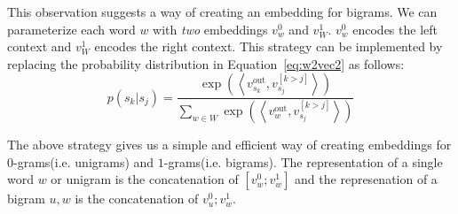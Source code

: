 \documentclass{article}
\renewcommand{\eqref}[1]{Equation~\ref{#1}}
\newcommand{\vo}[1]{v^{\textrm{out}}_{#1}}
\newcommand{\ip}[2]{\left\langle#1, #2\right\rangle}
\begin{document}
This observation suggests a way of creating an embedding for bigrams. We can
parameterize each word $w$ with \textit{two} embeddings $v_w^0$ and $v_W^1$.
$v_w^0$ encodes the left context and $v_W^1$ encodes the right context.
This strategy can be implemented by replacing the probability distribution in
\eqref{eq:w2vec2} as follows:
\begin{equation}\label{eq:w2vec3}
  p(s_k | s_j) = \frac{\exp\left(\ip{\vo{s_k}}{v_{s_j}^{[k>j]}}\right)}{\sum_{w \in W}\exp\left(\ip{\vo{w}}{v_{s_j}^{[k>j]}}\right)}
\end{equation}

The above strategy gives us a simple and efficient way of creating embeddings
for $0$-grams(i.e. unigrams) and $1$-grams(i.e. bigrams). The representation of
a single word $w$ or unigram is the concatenation of $[v_w^0; v_w^1]$ and the
represenation of a bigram $u,w$ is the concatenation of $v_u^0; v_w^1$.
\end{document}
